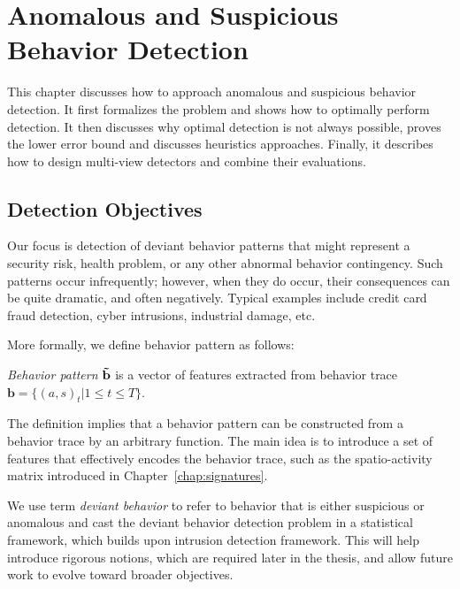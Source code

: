 
%
%
\chapter{Anomalous and Suspicious Behavior Detection}
\label{chap:detection}

This chapter discusses how to approach anomalous and suspicious behavior detection. It first formalizes the problem and shows how to optimally perform detection. It then discusses why optimal detection is not always possible, proves the lower error bound and discusses heuristics approaches. Finally, it describes how to design multi-view detectors and combine their evaluations. 

%
%
\section{Detection Objectives}

Our focus is detection of deviant behavior patterns that might represent a security risk, health problem, or any other abnormal behavior contingency. Such patterns occur  infrequently; however, when they do occur, their consequences can be quite dramatic, and  often negatively. Typical examples include credit card fraud detection, cyber intrusions, industrial damage, etc. 

More formally, we define behavior pattern as follows:
\begin{definition}
	\emph{Behavior pattern} $\mathbf{\tilde{b}}$ is a vector of features extracted from behavior trace $\mathbf{b}=\{(a, s)_t | 1 \leq t \leq T\}$.
\end{definition}
\noindent
The definition implies that a behavior pattern can be constructed from a behavior trace by an arbitrary function. The main idea is to introduce a set of features that effectively encodes the behavior trace, such as the spatio-activity matrix introduced in Chapter~\ref{chap:signatures}.


We use term \emph{deviant behavior} to refer to behavior that is either suspicious or anomalous and cast the deviant behavior detection problem in a statistical framework, which builds upon \cite{Helman1993} intrusion detection framework. This will help introduce rigorous notions, which are required later in the thesis, and allow future work to evolve toward broader objectives.

